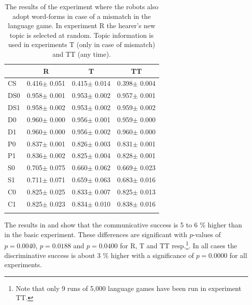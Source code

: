 \begin{table}
\centering
\begin{tabular}{lccc}
\lsptoprule
        &       R                       &       T                      &       TT     \\\midrule
CS      &          0.416$\pm$      0.051&          0.415$\pm$      0.014&          0.398$\pm$      0.004\\%
DS0     &          0.958$\pm$      0.001&          0.953$\pm$      0.002&          0.957$\pm$      0.001\\%
DS1     &          0.958$\pm$      0.002&          0.953$\pm$      0.002&          0.959$\pm$      0.002\\%
D0      &          0.960$\pm$      0.000&          0.956$\pm$      0.001&          0.959$\pm$      0.000\\%
D1      &          0.960$\pm$      0.000&          0.956$\pm$      0.002&          0.960$\pm$      0.000\\%
P0      &          0.837$\pm$      0.001&          0.826$\pm$      0.003&          0.831$\pm$      0.001\\%
P1      &          0.836$\pm$      0.002&          0.825$\pm$      0.004&          0.828$\pm$      0.001\\%
S0      &          0.705$\pm$      0.075&          0.660$\pm$      0.062&          0.669$\pm$      0.023\\%
S1      &          0.711$\pm$      0.071&          0.659$\pm$      0.063&          0.683$\pm$      0.016\\%
C0      &          0.825$\pm$      0.025&          0.833$\pm$      0.007&          0.825$\pm$      0.013\\%
C1      &          0.825$\pm$      0.023&          0.834$\pm$      0.010&          0.838$\pm$      0.016\\%
\lspbottomrule
\end{tabular}
\caption{The results of the experiment where the robots also adopt word-forms in case of a mismatch in the language game. In experiment R the hearer's new topic is selected at random. Topic information is used in experiments T (only in case of mismatch) and TT (any time).}
\label{t:lex:ass}
\end{table}

The results in  and  show that the communicative success is 5 to 6 \% higher than in the basic experiment. These differences are significant with $p$-values of $p=0.0040$, $p=0.0188$ and $p=0.0400$ for R, T and TT resp.\footnote{Note that only 9 runs of 5,000 language games have been run in experiment TT.}. In all cases the discriminative success is about 3 \% higher with a significance of $p=0.0000$ for all experiments.

